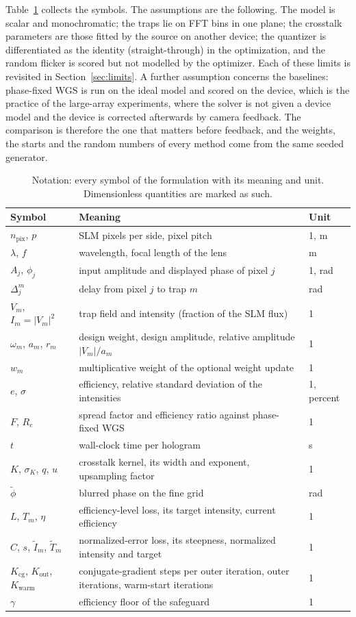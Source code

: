 Table~\ref{tab:notation} collects the symbols. The assumptions are the following. The model is scalar and monochromatic; the traps lie on FFT bins in one plane; the crosstalk parameters are those fitted by the source on another device; the quantizer is differentiated as the identity (straight-through) in the optimization, and the random flicker is scored but not modelled by the optimizer. Each of these limits is revisited in Section~\ref{sec:limits}. A further assumption concerns the baselines: phase-fixed WGS is run on the ideal model and scored on the device, which is the practice of the large-array experiments, where the solver is not given a device model and the device is corrected afterwards by camera feedback. The comparison is therefore the one that matters before feedback, and the weights, the starts and the random numbers of every method come from the same seeded generator.

\begin{table}[t]
\centering\small
\caption{Notation: every symbol of the formulation with its meaning and unit. Dimensionless quantities are marked as such.}
\label{tab:notation}
\begin{tabular}{@{}l p{8.2cm} l@{}}
\toprule
Symbol & Meaning & Unit\\
\midrule
$n_{\mathrm{pix}}$, $p$ & SLM pixels per side, pixel pitch & 1, m\\
$\lambda$, $f$ & wavelength, focal length of the lens & m\\
$A_j$, $\phi_j$ & input amplitude and displayed phase of pixel $j$ & 1, rad\\
$\Delta_j^m$ & delay from pixel $j$ to trap $m$ & rad\\
$V_m$, $I_m=|V_m|^2$ & trap field and intensity (fraction of the SLM flux) & 1\\
$\omega_m$, $a_m$, $r_m$ & design weight, design amplitude, relative amplitude $|V_m|/a_m$ & 1\\
$w_m$ & multiplicative weight of the optional weight update & 1\\
$e$, $\sigma$ & efficiency, relative standard deviation of the intensities & 1, percent\\
$F$, $R_e$ & spread factor and efficiency ratio against phase-fixed WGS & 1\\
$t$ & wall-clock time per hologram & s\\
$K$, $\sigma_K$, $q$, $u$ & crosstalk kernel, its width and exponent, upsampling factor & 1\\
$\tilde\phi$ & blurred phase on the fine grid & rad\\
$L$, $T_m$, $\eta$ & efficiency-level loss, its target intensity, current efficiency & 1\\
$C$, $s$, $\tilde I_m$, $\tilde T_m$ & normalized-error loss, its steepness, normalized intensity and target & 1\\
$K_{\mathrm{cg}}$, $K_{\mathrm{out}}$, $K_{\mathrm{warm}}$ & conjugate-gradient steps per outer iteration, outer iterations, warm-start iterations & 1\\
$\gamma$ & efficiency floor of the safeguard & 1\\
\bottomrule
\end{tabular}
\end{table}
